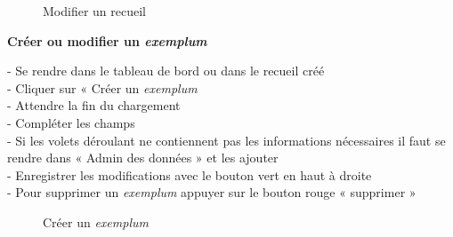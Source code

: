 	\begin{figure}[H]
	\centering
	\caption{Modifier un recueil}
	\end{figure}
	
\textbf{Créer ou modifier un \textit{exemplum}}
\begin{flushleft}	
	- Se rendre dans le tableau de bord ou dans le recueil créé \\
	- Cliquer sur « Créer un \textit{exemplum} \\
	- Attendre la fin du chargement \\
	- Compléter les champs \\
	- Si les volets déroulant ne contiennent pas les informations nécessaires il faut se rendre dans « Admin des données » et les ajouter \\
	- Enregistrer les modifications avec le bouton vert en haut à droite \\
	- Pour supprimer un \textit{exemplum} appuyer sur le bouton rouge « supprimer » \\
\end{flushleft}	
	
\begin{figure}[H]
	\centering
	\caption{Créer un \textit{exemplum}}
\end{figure}